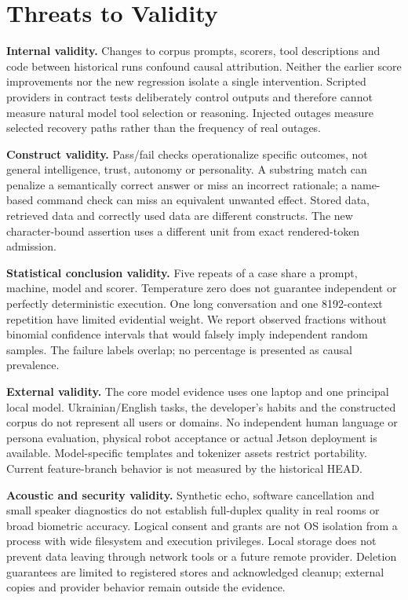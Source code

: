\documentclass[11pt]{article}
\begin{document}
\section{Threats to Validity}\label{sec:validity}
\textbf{Internal validity.} Changes to corpus prompts, scorers, tool descriptions and code between historical runs confound causal attribution. Neither the earlier score improvements nor the new regression isolate a single intervention. Scripted providers in contract tests deliberately control outputs and therefore cannot measure natural model tool selection or reasoning. Injected outages measure selected recovery paths rather than the frequency of real outages.

\textbf{Construct validity.} Pass/fail checks operationalize specific outcomes, not general intelligence, trust, autonomy or personality. A substring match can penalize a semantically correct answer or miss an incorrect rationale; a name-based command check can miss an equivalent unwanted effect. Stored data, retrieved data and correctly used data are different constructs. The new character-bound assertion uses a different unit from exact rendered-token admission.

\textbf{Statistical conclusion validity.} Five repeats of a case share a prompt, machine, model and scorer. Temperature zero does not guarantee independent or perfectly deterministic execution. One long conversation and one 8192-context repetition have limited evidential weight. We report observed fractions without binomial confidence intervals that would falsely imply independent random samples. The failure labels overlap; no percentage is presented as causal prevalence.

\textbf{External validity.} The core model evidence uses one laptop and one principal local model. Ukrainian/English tasks, the developer's habits and the constructed corpus do not represent all users or domains. No independent human language or persona evaluation, physical robot acceptance or actual Jetson deployment is available. Model-specific templates and tokenizer assets restrict portability. Current feature-branch behavior is not measured by the historical HEAD.

\textbf{Acoustic and security validity.} Synthetic echo, software cancellation and small speaker diagnostics do not establish full-duplex quality in real rooms or broad biometric accuracy. Logical consent and grants are not OS isolation from a process with wide filesystem and execution privileges. Local storage does not prevent data leaving through network tools or a future remote provider. Deletion guarantees are limited to registered stores and acknowledged cleanup; external copies and provider behavior remain outside the evidence.
\end{document}
